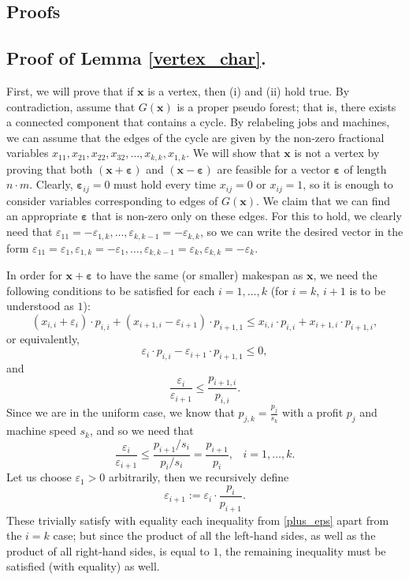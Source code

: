 \documentclass[moor,sglanonrev]{informs4}
\theoremstyle{plain}
\begin{document}
\begin{APPENDICES}

\section{Proofs}\label{app:proofs}

\subsection{Proof of Lemma \ref{vertex_char}.}
    First, we will prove that if $\bm{x}$ is a vertex, then (i) and (ii) hold true. 
    By contradiction, assume that $G(\bm{x})$ is a proper pseudo forest; that is, there exists a connected component that contains a cycle. By relabeling jobs and machines, we can assume that the edges of the cycle are given by the non-zero fractional variables $x_{11}, x_{21}, x_{22}, x_{32}, \ldots, x_{k,k}, x_{1,k}$. We will show that $\bm{x}$ is not a vertex by proving that both $(\bm{x} + \bm{\varepsilon})$ and $(\bm{x} - \bm{\varepsilon})$ are feasible for a vector $\bm{\varepsilon}$ of length $n\cdot m$. Clearly, $\bm{\varepsilon}_{ij} = 0$ must hold every time $x_{ij} = 0$ or $x_{ij}=1$, so it is enough to consider variables corresponding to edges of $G(\bm{x})$. We claim that we can find an appropriate $\bm{\varepsilon}$ that is non-zero only on these edges. For this to hold, we clearly need that $\varepsilon_{11} = - \varepsilon_{1,k}, \ldots, \varepsilon_{k,k-1} = - \varepsilon_{k,k}$, so we can write the desired vector in the form $\varepsilon_{11} = \varepsilon_1, \varepsilon_{1,k} = -\varepsilon_1, \ldots, \varepsilon_{k,k-1} = \varepsilon_k, \varepsilon_{k,k} = - \varepsilon_k$.

    In order for $\bm{x} + \bm{\varepsilon}$ to have the same (or smaller) makespan as $\bm{x}$, we need the following conditions to be satisfied for each $i=1,\ldots,k$ (for $i=k$, $i+1$ is to be understood as $1$):
    \[
    (x_{i,i} + \varepsilon_i)\cdot p_{i,i} + (x_{i+1,i}- \varepsilon_{i+1})\cdot p_{i+1,1} \le x_{i,i}\cdot p_{i,i} + x_{i+1,i}\cdot p_{i+1,i},
    \]
    or equivalently,
    \[
    \varepsilon_i \cdot p_{i,i} - \varepsilon_{i+1}\cdot p_{i+1,1} \le 0,
    \]
    and
    \[
    \frac{\varepsilon_i}{\varepsilon_{i+1}} \le \frac{p_{i+1,i}}{p_{i,i}}. 
    \]
    Since we are in the uniform case, we know that $p_{j,k} = \frac{p_j}{s_k}$ with a profit $p_j$ and machine speed $s_k$, and so we need that 
    \begin{equation}\label{plus_eps}
        \frac{\varepsilon_i}{\varepsilon_{i+1}} \le \frac{p_{i+1}/s_i}{p_i/s_i} = \frac{p_{i+1}}{p_i}, \,\,\,\,\, i = 1, \ldots, k.
    \end{equation}
    Let us choose $\varepsilon_1 > 0$ arbitrarily, then we recursively define 
    \[
    \varepsilon_{i+1} := \varepsilon_i \cdot \frac{p_i}{p_{i+1}}.
    \]
    These trivially satisfy with equality each inequality from \eqref{plus_eps} apart from the $i=k$ case; but since the product of all the left-hand sides, as well as the product of all right-hand sides, is equal to $1$, the remaining inequality must be satisfied (with equality) as well.


\end{APPENDICES}
\end{document}

